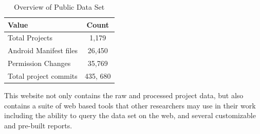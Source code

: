 \documentclass{sig-alternate-05-2015}
\begin{document}


 \begin{table}[h]
\begin{center}
\caption{Overview of Public Data Set}
\label{Table:publicdata}
 \begin{tabular}{ | l | c | } \hline

    \bfseries Value & \bfseries Count  \\ \hline \hline
    Total Projects & 1,179 \\ \hline
    Android Manifest files &  26,450 \\ \hline
    Permission Changes & 35,769 \\ \hline
    Total project commits & 435, 680 \\ \hline



  \end{tabular}
  \end{center}
\end{table}



This website not only contains the raw and processed project data, but also contains a suite of web based tools that other researchers may use in their work including the ability to query the data set on the web, and several customizable and pre-built reports.




%
%
%
%
%
%
%
%
%
\end{document}

